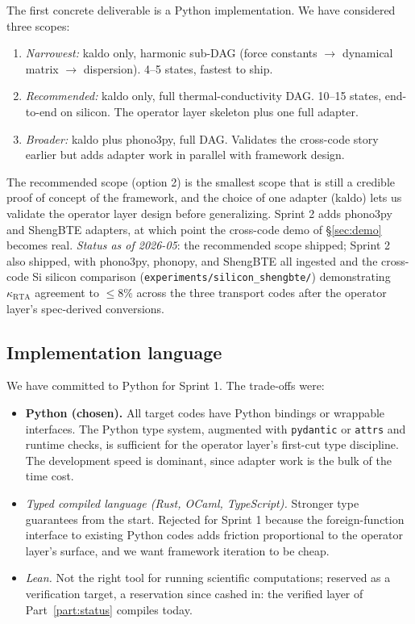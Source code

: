 \documentclass[11pt,a4paper]{article}
\begin{document}
The first concrete deliverable is a Python implementation. We have considered three scopes:

\begin{enumerate}[leftmargin=2em]
  \item \emph{Narrowest:} kaldo only, harmonic sub-DAG (force constants $\to$ dynamical matrix
        $\to$ dispersion). 4--5 states, fastest to ship.
  \item \emph{Recommended:} kaldo only, full thermal-conductivity DAG. 10--15 states, end-to-end
        on silicon. The operator layer skeleton plus one full adapter.
  \item \emph{Broader:} kaldo plus phono3py, full DAG. Validates the cross-code story earlier but
        adds adapter work in parallel with framework design.
\end{enumerate}

The recommended scope (option 2) is the smallest scope that is still a credible proof of concept
of the framework, and the choice of one adapter (kaldo) lets us validate the operator layer design
before generalizing. Sprint 2 adds phono3py and ShengBTE adapters, at which point the cross-code
demo of \S\ref{sec:demo} becomes real. \emph{Status as of 2026-05}: the
recommended scope shipped; Sprint 2 also shipped, with phono3py, phonopy,
and ShengBTE all ingested and the cross-code Si silicon comparison
(\texttt{experiments/silicon\_shengbte/}) demonstrating $\kappa_\text{RTA}$
agreement to $\le 8\%$ across the three transport codes after the operator
layer's spec-derived conversions.

\subsection{Implementation language}

We have committed to Python for Sprint 1. The trade-offs were:

\begin{itemize}[leftmargin=2em]
  \item \textbf{Python (chosen).} All target codes have Python bindings or wrappable interfaces.
        The Python type system, augmented with \texttt{pydantic} or \texttt{attrs} and runtime
        checks, is sufficient for the operator layer's first-cut type discipline. The development
        speed is dominant, since adapter work is the bulk of the time cost.
  \item \emph{Typed compiled language (Rust, OCaml, TypeScript).} Stronger type guarantees from
        the start. Rejected for Sprint 1 because the foreign-function interface to existing
        Python codes adds friction proportional to the operator layer's surface, and we want
        framework iteration to be cheap.
  \item \emph{Lean.} Not the right tool for running scientific computations;
        reserved as a verification target, a reservation since cashed in: the
        verified layer of Part~\ref{part:status} compiles today.
\end{itemize}
\end{document}
